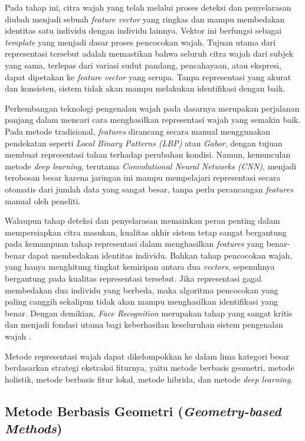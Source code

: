 Pada tahap ini, citra wajah yang telah melalui proses deteksi dan penyelarasan diubah menjadi sebuah \textit{feature vector} yang ringkas dan mampu membedakan identitas satu individu dengan individu lainnya. Vektor ini berfungsi sebagai \textit{template} yang menjadi dasar proses pencocokan wajah. Tujuan utama dari representasi tersebut adalah memastikan bahwa seluruh citra wajah dari subjek yang sama, terlepas dari variasi sudut pandang, pencahayaan, atau ekspresi, dapat dipetakan ke \textit{feature vector} yang serupa. Tanpa representasi yang akurat dan konsisten, sistem tidak akan mampu melakukan identifikasi dengan baik.

Perkembangan teknologi pengenalan wajah pada dasarnya merupakan perjalanan panjang dalam mencari cara menghasilkan representasi wajah yang semakin baik. Pada metode tradisional, \textit{features} dirancang secara manual menggunakan pendekatan seperti \textit{Local Binary Patterns (LBP)} atau \textit{Gabor}, dengan tujuan membuat representasi tahan terhadap perubahan kondisi. Namun, kemunculan metode \textit{deep learning}, terutama \textit{Convolutional Neural Networks (CNN)}, menjadi terobosan besar karena jaringan ini mampu mempelajari representasi secara otomatis dari jumlah data yang sangat besar, tanpa perlu perancangan \textit{features} manual oleh peneliti.

Walaupun tahap deteksi dan penyelarasan memainkan peran penting dalam mempersiapkan citra masukan, kualitas akhir sistem tetap sangat bergantung pada kemampuan tahap representasi dalam menghasilkan \textit{features} yang benar-benar dapat membedakan identitas individu. Bahkan tahap pencocokan wajah, yang hanya menghitung tingkat kemiripan antara dua \textit{vectors}, sepenuhnya bergantung pada kualitas representasi tersebut. Jika representasi gagal membedakan dua individu yang berbeda, maka algoritma pencocokan yang paling canggih sekalipun tidak akan mampu menghasilkan identifikasi yang benar. Dengan demikian, \textit{Face Recognition} merupakan tahap yang sangat kritis dan menjadi fondasi utama bagi keberhasilan keseluruhan sistem pengenalan wajah \autocite{Trigueros2018}.

Metode representasi wajah dapat dikelompokkan ke dalam lima kategori besar berdasarkan strategi ekstraksi fiturnya, yaitu metode berbasis geometri, metode holistik, metode berbasis fitur lokal, metode hibrida, dan metode \textit{deep learning}.

\subsection{Metode Berbasis Geometri (\textit{Geometry-based Methods})}


